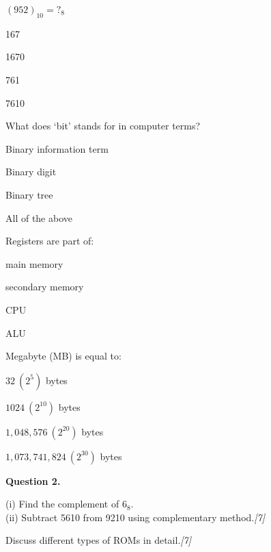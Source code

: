 \documentclass[11pt,a4paper]{article}
\newcommand{\pts}[1]{\hfill \textit{[#1]}}
\begin{document}
\begin{parts}
  \item $(952)_{10} = ?_8$
    \begin{parts}
      \item 167
      \item 1670
      \item 761
      \item 7610
    \end{parts}

  \item What does `bit' stands for in computer terms?
    \begin{parts}
      \item Binary information term
      \item Binary digit
      \item Binary tree
      \item All of the above
    \end{parts}

  \item Registers are part of:
    \begin{parts}
      \item main memory
      \item secondary memory
      \item CPU
      \item ALU
    \end{parts}

  \item Megabyte (MB) is equal to:
    \begin{parts}
      \item $32\ (2^5)$ bytes
      \item $1024\ (2^{10})$ bytes
      \item $1,048,576\ (2^{20})$ bytes
      \item $1,073,741,824\ (2^{30})$ bytes
    \end{parts}
\end{parts}

\bigskip

\noindent \textbf{Question 2.}

\begin{parts}
  \item (i) Find the complement of $6_8$.\\[2pt]
        (ii) Subtract 5610 from 9210 using complementary method.\pts{7}
  \item Discuss different types of ROMs in detail.\pts{7}
\end{parts}
\end{document}

